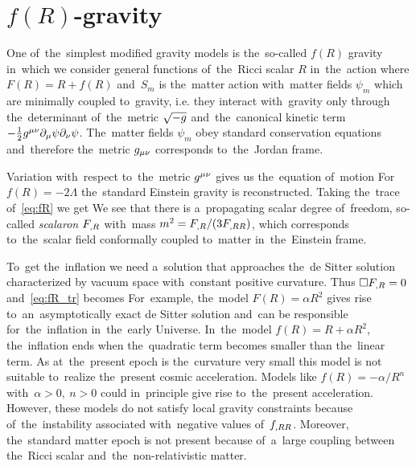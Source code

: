 \section{$f(R)$-gravity}
\label{sec:fR}
One of~the~simplest modified gravity models is the~so-called $f(R)$ gravity in~which we consider general functions of~the~Ricci scalar $R$ in~the~action
where $F(R)=R+f(R)$ and~$S_m$ is the~matter action with~matter fields $\psi_m$ which are minimally coupled to~gravity, i.e. they interact with~gravity only through the~determinant of~the~metric $\sqrt{-g}$ and~the~canonical kinetic term $-\frac12g^{\mu\nu}\partial_\mu\psi\partial_\nu\psi$. The~matter fields $\psi_m$ obey standard conservation equations and~therefore the~metric $g_{\mu\nu}$ corresponds to~the~Jordan frame.

Variation with~respect to~the~metric $g^{\mu\nu}$ gives us the~equation of~motion
For~$f(R)=-2\Lambda$ the~standard Einstein gravity is reconstructed. Taking the~trace of~\eqref{eq:fR} we get
We see that there is a~propagating scalar degree of~freedom, so-called \textit{scalaron} $F_{,R}$ with~mass $m^2=F_{,R}/(3F_{,RR})$, which corresponds to~the~scalar field conformally coupled to~matter in~the~Einstein frame.

To~get the~inflation we need a~solution that approaches the~de Sitter solution characterized by vacuum space with~constant positive curvature. Thus $\Box F_{,R}=0$ and~\eqref{eq:fR_tr} becomes
For~example, the~model $F(R)=\alpha R^2$ gives rise to~an~asymptotically exact de Sitter solution and~can be responsible for~the~inflation in~the~early Universe. In~the~model $f(R) = R + \alpha R^2$, the~inflation ends when the~quadratic term becomes smaller than the~linear term. As at~the~present epoch is the~curvature very small this model is not suitable to~realize the~present cosmic acceleration. Models like $f(R)=-\alpha/R^n$ with~$\alpha>0,\ n>0$ could in~principle give rise to~the~present acceleration. However, these models do not satisfy local gravity constraints because of~the~instability associated with~negative values of~$f_{,RR}$. Moreover, the~standard matter epoch is not present because of~a~large coupling between the~Ricci scalar and~the~non-relativistic matter.

